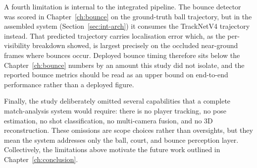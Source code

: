 A fourth limitation is internal to the integrated pipeline. The bounce detector was scored in Chapter~\ref{ch:bounce} on the ground-truth ball trajectory, but in the assembled system (Section~\ref{sec:int-arch}) it consumes the TrackNetV4 trajectory instead. That predicted trajectory carries localisation error which, as the per-visibility breakdown showed, is largest precisely on the occluded near-ground frames where bounces occur. Deployed bounce timing therefore sits below the Chapter~\ref{ch:bounce} numbers by an amount this study did not isolate, and the reported bounce metrics should be read as an upper bound on end-to-end performance rather than a deployed figure.

Finally, the study deliberately omitted several capabilities that a complete match-analysis system would require: there is no player tracking, no pose estimation, no shot classification, no multi-camera fusion, and no 3D reconstruction. These omissions are scope choices rather than oversights, but they mean the system addresses only the ball, court, and bounce perception layer. Collectively, the limitations above motivate the future work outlined in Chapter~\ref{ch:conclusion}.
